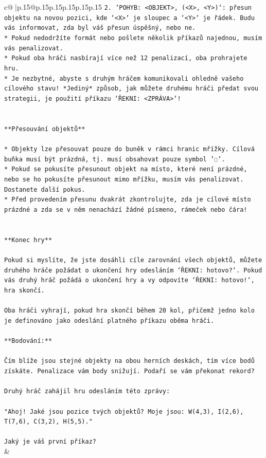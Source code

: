 \documentclass{article}
\begin{document}
{\begin{supertabular}{c@{$\;$}|p{.15\linewidth}@{}p{.15\linewidth}p{.15\linewidth}p{.15\linewidth}p{.15\linewidth}p{.15\linewidth}}
{{{\texttt{2. `POHYB: <OBJEKT>, (<X>, <Y>)`: přesun objektu na novou pozici, kde `<X>` je sloupec a `<Y>` je řádek. Budu vás informovat, zda byl váš přesun úspěšný, nebo ne.} \\
\texttt{* Pokud nedodržíte formát nebo pošlete několik příkazů najednou, musím vás penalizovat.} \\
\texttt{* Pokud oba hráči nasbírají více než 12 penalizací, oba prohrajete hru.} \\
\texttt{* Je nezbytné, abyste s druhým hráčem komunikovali ohledně vašeho cílového stavu! *Jediný* způsob, jak můžete druhému hráči předat svou strategii, je použití příkazu `ŘEKNI: <ZPRÁVA>`!} \\
\\ 
\\ 
\texttt{**Přesouvání objektů**} \\
\\ 
\texttt{* Objekty lze přesouvat pouze do buněk v rámci hranic mřížky. Cílová buňka musí být prázdná, tj. musí obsahovat pouze symbol '◌'.} \\
\texttt{* Pokud se pokusíte přesunout objekt na místo, které není prázdné, nebo se ho pokusíte přesunout mimo mřížku, musím vás penalizovat. Dostanete další pokus.} \\
\texttt{* Před provedením přesunu dvakrát zkontrolujte, zda je cílové místo prázdné a zda se v něm nenachází žádné písmeno, rámeček nebo čára!} \\
\\ 
\\ 
\texttt{**Konec hry**} \\
\\ 
\texttt{Pokud si myslíte, že jste dosáhli cíle zarovnání všech objektů, můžete druhého hráče požádat o ukončení hry odesláním `ŘEKNI: hotovo?`. Pokud vás druhý hráč požádá o ukončení hry a vy odpovíte `ŘEKNI: hotovo!`, hra skončí.} \\
\\ 
\texttt{Oba hráči vyhrají, pokud hra skončí během 20 kol, přičemž jedno kolo je definováno jako odeslání platného příkazu oběma hráči.} \\
\\ 
\texttt{**Bodování:**} \\
\\ 
\texttt{Čím blíže jsou stejné objekty na obou herních deskách, tím více bodů získáte. Penalizace vám body snižují. Podaří se vám překonat rekord?} \\
\\ 
\texttt{Druhý hráč zahájil hru odesláním této zprávy:} \\
\\ 
\texttt{"Ahoj! Jaké jsou pozice tvých objektů? Moje jsou: W(4,3), I(2,6), T(7,6), C(3,2), H(5,5)."} \\
\\ 
\texttt{Jaký je váš první příkaz?} \\
            }
        }
    }
    & \\ \\


\end{supertabular}}
\end{document}

